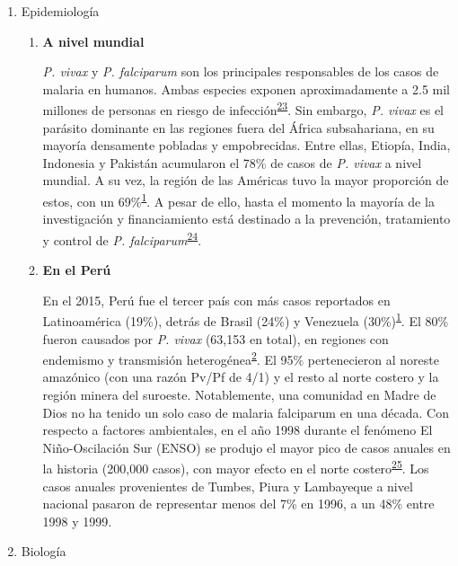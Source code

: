 \documentclass[]{article}
\begin{document}
\begin{enumerate}
\def\labelenumi{\alph{enumi}.}
\item
  Epidemiología

  \begin{enumerate}
  \def\labelenumii{\roman{enumii}.}
  \item
    \textbf{A nivel mundial}

    \emph{P. vivax} y \emph{P. falciparum} son los principales
    responsables de los casos de malaria en humanos. Ambas especies
    exponen aproximadamente a 2.5 mil millones de personas en riesgo de
    infección\textsuperscript{\protect\hyperlink{ref-howes2016global}{23}}.
    Sin embargo, \emph{P. vivax} es el parásito dominante en las
    regiones fuera del África subsahariana, en su mayoría densamente
    pobladas y empobrecidas. Entre ellas, Etiopía, India, Indonesia y
    Pakistán acumularon el 78\% de casos de \emph{P. vivax} a nivel
    mundial. A su vez, la región de las Américas tuvo la mayor
    proporción de estos, con un
    69\%\textsuperscript{\protect\hyperlink{ref-WHO2016world}{1}}. A
    pesar de ello, hasta el momento la mayoría de la investigación y
    financiamiento está destinado a la prevención, tratamiento y control
    de \emph{P.
    falciparum}\textsuperscript{\protect\hyperlink{ref-path2011}{24}}.
  \item
    \textbf{En el Perú}

    En el 2015, Perú fue el tercer país con más casos reportados en
    Latinoamérica (19\%), detrás de Brasil (24\%) y Venezuela
    (30\%)\textsuperscript{\protect\hyperlink{ref-WHO2016world}{1}}. El
    80\% fueron causados por \emph{P. vivax} (63,153 en total), en
    regiones con endemismo y transmisión
    heterogénea\textsuperscript{\protect\hyperlink{ref-rosas2016peru}{2}}.
    El 95\% pertenecieron al noreste amazónico (con una razón Pv/Pf de
    4/1) y el resto al norte costero y la región minera del suroeste.
    Notablemente, una comunidad en Madre de Dios no ha tenido un solo
    caso de malaria falciparum en una década. Con respecto a factores
    ambientales, en el año 1998 durante el fenómeno El Niño-Oscilación
    Sur (ENSO) se produjo el mayor pico de casos anuales en la historia
    (200,000 casos), con mayor efecto en el norte
    costero\textsuperscript{\protect\hyperlink{ref-gagnon2002enso}{25}}.
    Los casos anuales provenientes de Tumbes, Piura y Lambayeque a nivel
    nacional pasaron de representar menos del 7\% en 1996, a un 48\%
    entre 1998 y 1999.
  \end{enumerate}
\item
  Biología


\end{enumerate}
\end{document}
